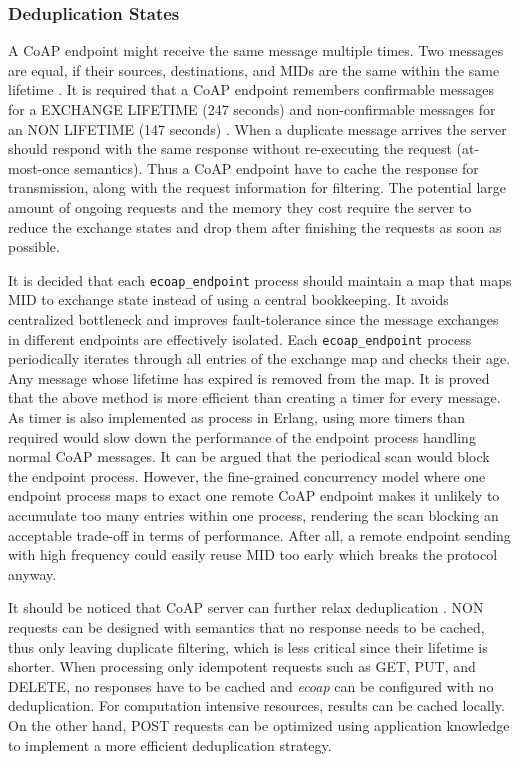 \subsubsection{Deduplication States}

A CoAP endpoint might receive the same message multiple times. Two messages are equal, if their sources, destinations, and MIDs are the same within the same lifetime \cite{lanter2013scalability}. It is required that a CoAP endpoint remembers confirmable messages for a EXCHANGE LIFETIME (247 seconds) and non-confirmable messages for an NON LIFETIME (147 seconds) \cite{coap_protocol}. When a duplicate message arrives the server should respond with the same response without re-executing the request (at-most-once semantics). Thus a CoAP endpoint have to cache the response for transmission, along with the request information for filtering. The potential large amount of ongoing requests and the memory they cost require the server to reduce the exchange states and drop them after finishing the requests as soon as possible. 

It is decided that each \verb|ecoap_endpoint| process should maintain a map that maps MID to exchange state instead of using a central bookkeeping. It avoids centralized bottleneck and improves fault-tolerance since the message exchanges in different endpoints are effectively isolated. Each \verb|ecoap_endpoint| process periodically iterates through all entries of the exchange map and checks their age. Any message whose lifetime has expired is removed from the map. It is proved that the above method is more efficient than creating a timer for every message. As timer is also implemented as process in Erlang, using more timers than required would slow down the performance of the endpoint process handling normal CoAP messages. It can be argued that the periodical scan would block the endpoint process. However, the fine-grained concurrency model where one endpoint process maps to exact one remote CoAP endpoint makes it unlikely to accumulate too many entries within one process, rendering the scan blocking an acceptable trade-off in terms of performance. After all, a remote endpoint sending with high frequency could easily reuse MID too early which breaks the protocol anyway.

It should be noticed that CoAP server can further relax deduplication \cite{coap_protocol}. NON requests can be designed with semantics that no response needs to be cached, thus only leaving duplicate filtering, which is less critical since their lifetime is shorter. When processing only idempotent requests such as GET, PUT, and DELETE, no responses have to be cached and \textit{ecoap} can be configured with no deduplication. For computation intensive resources, results can be cached locally. On the other hand, POST requests can be optimized using application knowledge to implement a more efficient deduplication strategy. 

